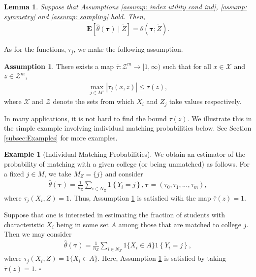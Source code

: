 \documentclass[12pt, fullpage]{amsart}
\newtheorem{lemma}{Lemma}[section]
\theoremstyle{definition}
\theoremstyle{definition}
\newtheorem{assumption}{Assumption}[section]
\theoremstyle{definition}
\newtheorem{example}{Example}[section]
\begin{document}
\begin{bibunit}[econometrica]
\begin{lemma}
    \label{lemm: unbiased}
    Suppose that Assumptions \ref{assump: index utility cond ind}, \ref{assump: symmetry} and \ref{assump: sampling} hold. Then,
    \begin{align*}
       \mathbf{E}\left[ \hat \theta(\boldsymbol{\tau}) \mid \tilde Z \right] = \theta(\boldsymbol{\tau};\tilde Z). 
    \end{align*}
\end{lemma}

As for the functions, $\tau_{j}$, we make the following assumption.
\begin{assumption}
	\label{assump: varphi}
	There exists a map $\overline \tau: \mathcal{Z}^m \rightarrow [1, \infty)$ such that for all $x \in \mathcal{X}$ and $z \in \mathcal{Z}^m$, 
	\begin{align*}
		\max_{j \in M'}\left| \tau_{j}(x,z) \right| \le \overline \tau(z),
	\end{align*}
	where $\mathcal{X}$ and $\mathcal{Z}$ denote the sets from which $X_i$ and $Z_j$ take values respectively. 
\end{assumption}

In many applications, it is not hard to find the bound $\overline \tau(z)$. We illustrate this in the simple example involving individual matching probabilities below. See Section \ref{subsec:Examples} for more examples.

\begin{example}[Individual Matching Probabilities]\label{example_individual_matching_probabilities}  We obtain an estimator of the probability of matching with a given college (or being unmatched) as follows. 	For a fixed $j\in M$, we take $M_Z = \{j\}$ and consider
	\begin{align*}
		\hat \theta(\boldsymbol{\tau}) = \frac{1}{n_Z}\sum_{i\in N_Z}1\left\{Y_i = j\right\}, \boldsymbol{\tau} = (\tau_0,\tau_1,...,\tau_m),
	\end{align*}
	where $\tau_{j}\left( X_i, Z \right) = 1$. Thus, Assumption  \ref{assump: varphi} is satisfied with the map $\overline \tau(z)=1$. 
	
	Suppose that one is interested in estimating the fraction of students with characteristic $X_i$ being in some set $A$ among those that are matched to college $j$. Then we may consider
		\begin{align*}
		\hat \theta(\boldsymbol{\tau}) = \frac{1}{n_Z}\sum_{i\in N_Z}1\{X_{i}\in A\}1\left\{Y_i = j\right\},
	\end{align*}
	where $\tau_{j}\left( X_i, Z \right) = 1\{X_{i}\in A\}$.  Here, Assumption  \ref{assump: varphi} is satisfied by taking $\overline \tau(z)=1$. $\square$
\end{example}


\end{bibunit}
\end{document}
